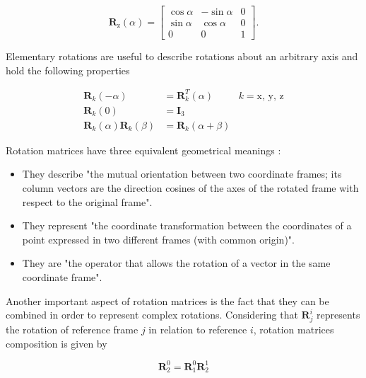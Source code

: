 \begin{equation}
    \boldsymbol{R}_{\text{z}}(\alpha) = 
    \begin{bmatrix} \cos{\alpha} & -\sin{\alpha} & 0\\
    \sin{\alpha} & \cos{\alpha} & 0\\
    0 & 0 & 1
    \end{bmatrix}.
\end{equation}

Elementary rotations are useful to describe rotations about an arbitrary axis and hold the following properties \cite{Siciliano2009_robotics_modelling_planning_control, Spong2005_robot_dynamics_control} 

\begin{align}
    \boldsymbol{R}_{k}(-\alpha) &= \boldsymbol{R}_{k}^{T}(\alpha) & k = \text{x, y, z}\\
    \boldsymbol{R}_{k}(0) &= \boldsymbol{I}_3 & \\
    \boldsymbol{R}_{k}(\alpha)\boldsymbol{R}_{k}(\beta) &= \boldsymbol{R}_{k}(\alpha+\beta) &
\end{align}

Rotation matrices have three equivalent geometrical meanings \cite{Siciliano2009_robotics_modelling_planning_control}:

\begin{itemize}
    \item They describe "the mutual orientation between two coordinate frames; its column vectors are the direction cosines of the axes of the rotated frame with respect to the original frame".
    \item They represent "the coordinate transformation between the coordinates of a point expressed in two different frames (with common origin)".
    \item They are "the operator that allows the rotation of a vector in the same coordinate frame".
\end{itemize}

Another important aspect of rotation matrices is the fact that they can be combined in order to represent complex rotations. Considering that $\boldsymbol{R}^{i}_{j}$ represents the rotation of reference frame $j$ in relation to reference $i$, rotation matrices composition is given by

\begin{equation}
    \boldsymbol{R}^{0}_{2} = \boldsymbol{R}^{0}_{1}\boldsymbol{R}^{1}_{2}
\end{equation}

